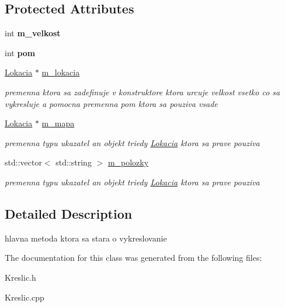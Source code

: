 \subsection*{Protected Attributes}
\begin{DoxyCompactItemize}
\item 
\hypertarget{class_kreslic_a1fb614c273d51f93c86f8589d5d91f1d}{int {\bfseries m\-\_\-velkost}}\label{class_kreslic_a1fb614c273d51f93c86f8589d5d91f1d}

\item 
\hypertarget{class_kreslic_a8773018fd134429d99f9d999bda4c424}{int {\bfseries pom}}\label{class_kreslic_a8773018fd134429d99f9d999bda4c424}

\item 
\hypertarget{class_kreslic_a10efd37dd45c5ad887835eae6e3c463a}{\hyperlink{class_lokacia}{Lokacia} $\ast$ \hyperlink{class_kreslic_a10efd37dd45c5ad887835eae6e3c463a}{m\-\_\-lokacia}}\label{class_kreslic_a10efd37dd45c5ad887835eae6e3c463a}

\begin{DoxyCompactList}\small\item\em premenna ktora sa zadefinuje v konstruktore ktora urcuje velkost vsetko co sa vykresluje a pomocna premenna pom ktora sa pouziva vsade \end{DoxyCompactList}\item 
\hypertarget{class_kreslic_ab36883117907f55e5c3af6e13dda3d6e}{\hyperlink{class_lokacia}{Lokacia} $\ast$ \hyperlink{class_kreslic_ab36883117907f55e5c3af6e13dda3d6e}{m\-\_\-mapa}}\label{class_kreslic_ab36883117907f55e5c3af6e13dda3d6e}

\begin{DoxyCompactList}\small\item\em premenna typu ukazatel an objekt triedy \hyperlink{class_lokacia}{Lokacia} ktora sa prave pouziva \end{DoxyCompactList}\item 
\hypertarget{class_kreslic_ade0686fa0ef71327df9ff89c3e50f015}{std\-::vector$<$ std\-::string $>$ \hyperlink{class_kreslic_ade0686fa0ef71327df9ff89c3e50f015}{m\-\_\-polozky}}\label{class_kreslic_ade0686fa0ef71327df9ff89c3e50f015}

\begin{DoxyCompactList}\small\item\em premenna typu ukazatel an objekt triedy \hyperlink{class_lokacia}{Lokacia} ktora sa prave pouziva \end{DoxyCompactList}\end{DoxyCompactItemize}


\subsection{Detailed Description}
hlavna metoda ktora sa stara o vykreslovanie 

The documentation for this class was generated from the following files\-:\begin{DoxyCompactItemize}
\item 
Kreslic.\-h\item 
Kreslic.\-cpp\end{DoxyCompactItemize}
